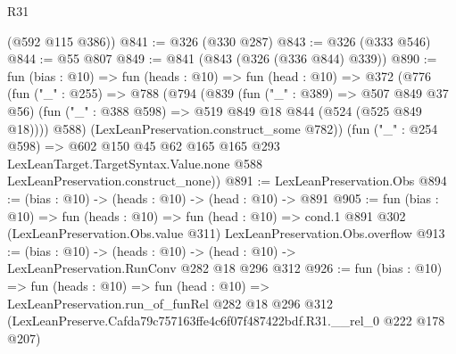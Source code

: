 \begin{lexlean}{R31}
\begin{coremodule}
      (@592 @115 @386))
@841 := @326 (@330 @287)
@843 := @326 (@333 @546)
@844 := @55 @807
@849 := @841 (@843 (@326 (@336 @844) @339))
@890 := fun (bias : @10) =>
  fun (heads : @10) =>
  fun (head : @10) =>
  @372
    (@776
      (fun ("_" : @255) =>
      @788
        (@794
          (@839
            (fun ("_" : @389) => @507 @849 @37 @56)
            (fun ("_" : @388 @598) => @519 @849 @18 @844 (@524 (@525 @849 @18))))
          @588)
        (LexLeanPreservation.construct_some @782))
      (fun ("_" : @254 @598) =>
      @602
        @150
        @45
        @62
        @165
        @165
        @293
        LexLeanTarget.TargetSyntax.Value.none
        @588
        LexLeanPreservation.construct_none))
@891 := LexLeanPreservation.Obs
@894 := (bias : @10) -> (heads : @10) -> (head : @10) -> @891
@905 := fun (bias : @10) =>
  fun (heads : @10) =>
  fun (head : @10) =>
  cond.{1} @891 @302 (LexLeanPreservation.Obs.value @311) LexLeanPreservation.Obs.overflow
@913 := (bias : @10) ->
  (heads : @10) -> (head : @10) -> LexLeanPreservation.RunConv @282 @18 @296 @312
@926 := fun (bias : @10) =>
  fun (heads : @10) =>
  fun (head : @10) =>
  LexLeanPreservation.run_of_funRel
    @282
    @18
    @296
    @312
    (LexLeanPreserve.Cafda79c757163ffe4c6f07f487422bdf.R31.__rel_0 @222 @178 @207)
\end{coremodule}
\end{lexlean}
